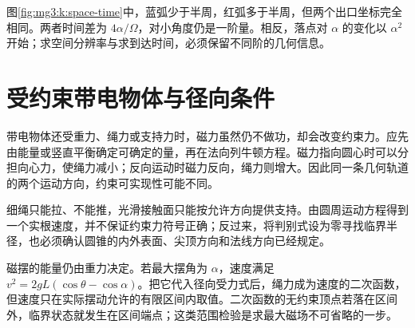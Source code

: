 图\ref{fig:mg3:k:space-time}中，蓝弧少于半周，红弧多于半周，但两个出口坐标完全相同。两者时间差为 $4\alpha/\Omega$，对小角度仍是一阶量。相反，落点对 $\alpha$ 的变化以 $\alpha^2$ 开始；求空间分辨率与求到达时间，必须保留不同阶的几何信息。



\section{受约束带电物体与径向条件}
带电物体还受重力、绳力或支持力时，磁力虽然仍不做功，却会改变约束力。应先由能量或竖直平衡确定可确定的量，再在法向列牛顿方程。磁力指向圆心时可以分担向心力，使绳力减小；反向运动时磁力反向，绳力则增大。因此同一条几何轨道的两个运动方向，约束可实现性可能不同。


细绳只能拉、不能推，光滑接触面只能按允许方向提供支持。由圆周运动方程得到一个实根速度，并不保证约束力符号正确；反过来，将判别式设为零寻找临界半径，也必须确认圆锥的内外表面、尖顶方向和法线方向已经规定。


磁摆的能量仍由重力决定。若最大摆角为 $\alpha$，速度满足 $v^2=2gL(\cos\theta-\cos\alpha)$。把它代入径向受力式后，绳力成为速度的二次函数，但速度只在实际摆动允许的有限区间内取值。二次函数的无约束顶点若落在区间外，临界状态就发生在区间端点；这类范围检验是求最大磁场不可省略的一步。

